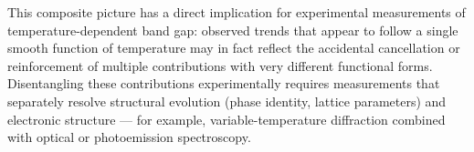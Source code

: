 This composite picture has a direct implication for experimental
measurements of temperature-dependent band gap: observed trends that
appear to follow a single smooth function of temperature may in fact
reflect the accidental cancellation or reinforcement of multiple
contributions with very different functional forms.
Disentangling these contributions experimentally requires
measurements that separately resolve structural evolution (phase
identity, lattice parameters) and electronic structure --- for
example, variable-temperature diffraction combined with optical or
photoemission spectroscopy.

